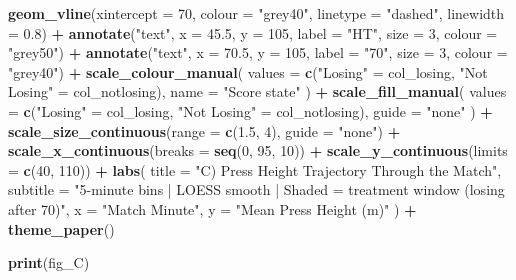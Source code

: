 \documentclass[
]{article}
\newenvironment{Shaded}{\begin{snugshade}}{\end{snugshade}}
\newcommand{\AttributeTok}[1]{\textcolor[rgb]{0.13,0.29,0.53}{#1}}
\newcommand{\DecValTok}[1]{\textcolor[rgb]{0.00,0.00,0.81}{#1}}
\newcommand{\FloatTok}[1]{\textcolor[rgb]{0.00,0.00,0.81}{#1}}
\newcommand{\FunctionTok}[1]{\textcolor[rgb]{0.13,0.29,0.53}{\textbf{#1}}}
\newcommand{\NormalTok}[1]{#1}
\newcommand{\OtherTok}[1]{\textcolor[rgb]{0.56,0.35,0.01}{#1}}
\newcommand{\SpecialCharTok}[1]{\textcolor[rgb]{0.81,0.36,0.00}{\textbf{#1}}}
\newcommand{\StringTok}[1]{\textcolor[rgb]{0.31,0.60,0.02}{#1}}
\begin{document}
\begin{Shaded}
\begin{Highlighting}[]
  \FunctionTok{geom\_vline}\NormalTok{(}\AttributeTok{xintercept =} \DecValTok{70}\NormalTok{, }\AttributeTok{colour =} \StringTok{"grey40"}\NormalTok{, }\AttributeTok{linetype =} \StringTok{"dashed"}\NormalTok{, }\AttributeTok{linewidth =} \FloatTok{0.8}\NormalTok{) }\SpecialCharTok{+}
  \FunctionTok{annotate}\NormalTok{(}\StringTok{"text"}\NormalTok{, }\AttributeTok{x =} \FloatTok{45.5}\NormalTok{, }\AttributeTok{y =} \DecValTok{105}\NormalTok{, }\AttributeTok{label =} \StringTok{"HT"}\NormalTok{, }\AttributeTok{size =} \DecValTok{3}\NormalTok{, }\AttributeTok{colour =} \StringTok{"grey50"}\NormalTok{) }\SpecialCharTok{+}
  \FunctionTok{annotate}\NormalTok{(}\StringTok{"text"}\NormalTok{, }\AttributeTok{x =} \FloatTok{70.5}\NormalTok{, }\AttributeTok{y =} \DecValTok{105}\NormalTok{, }\AttributeTok{label =} \StringTok{"70\textquotesingle{}"}\NormalTok{, }\AttributeTok{size =} \DecValTok{3}\NormalTok{, }\AttributeTok{colour =} \StringTok{"grey40"}\NormalTok{) }\SpecialCharTok{+}
  \FunctionTok{scale\_colour\_manual}\NormalTok{(}
    \AttributeTok{values =} \FunctionTok{c}\NormalTok{(}\StringTok{"Losing"} \OtherTok{=}\NormalTok{ col\_losing, }\StringTok{"Not Losing"} \OtherTok{=}\NormalTok{ col\_notlosing),}
    \AttributeTok{name   =} \StringTok{"Score state"}
\NormalTok{  ) }\SpecialCharTok{+}
  \FunctionTok{scale\_fill\_manual}\NormalTok{(}
    \AttributeTok{values =} \FunctionTok{c}\NormalTok{(}\StringTok{"Losing"} \OtherTok{=}\NormalTok{ col\_losing, }\StringTok{"Not Losing"} \OtherTok{=}\NormalTok{ col\_notlosing),}
    \AttributeTok{guide  =} \StringTok{"none"}
\NormalTok{  ) }\SpecialCharTok{+}
  \FunctionTok{scale\_size\_continuous}\NormalTok{(}\AttributeTok{range =} \FunctionTok{c}\NormalTok{(}\FloatTok{1.5}\NormalTok{, }\DecValTok{4}\NormalTok{), }\AttributeTok{guide =} \StringTok{"none"}\NormalTok{) }\SpecialCharTok{+}
  \FunctionTok{scale\_x\_continuous}\NormalTok{(}\AttributeTok{breaks =} \FunctionTok{seq}\NormalTok{(}\DecValTok{0}\NormalTok{, }\DecValTok{95}\NormalTok{, }\DecValTok{10}\NormalTok{)) }\SpecialCharTok{+}
  \FunctionTok{scale\_y\_continuous}\NormalTok{(}\AttributeTok{limits =} \FunctionTok{c}\NormalTok{(}\DecValTok{40}\NormalTok{, }\DecValTok{110}\NormalTok{)) }\SpecialCharTok{+}
  \FunctionTok{labs}\NormalTok{(}
    \AttributeTok{title    =} \StringTok{"C) Press Height Trajectory Through the Match"}\NormalTok{,}
    \AttributeTok{subtitle =} \StringTok{"5{-}minute bins | LOESS smooth | Shaded = treatment window (losing after 70\textquotesingle{})"}\NormalTok{,}
    \AttributeTok{x        =} \StringTok{"Match Minute"}\NormalTok{,}
    \AttributeTok{y        =} \StringTok{"Mean Press Height (m)"}
\NormalTok{  ) }\SpecialCharTok{+}
  \FunctionTok{theme\_paper}\NormalTok{()}

\FunctionTok{print}\NormalTok{(fig\_C)}
\end{Highlighting}
\end{Shaded}
\end{document}
